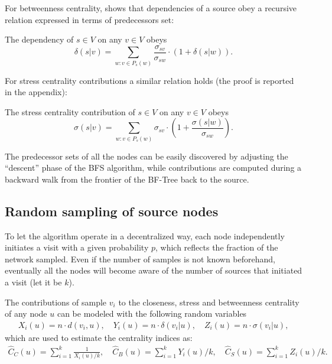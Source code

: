 For betweenness centrality, \cite{brandes2001} shows that dependencies of a source obey a recursive relation expressed in terms of predecessors set:
\begin{theorem}[Brandes, 2001]
The dependency of $s \in V$ on any $v \in V$ obeys
\begin{equation}
\delta(s|v) = \sum_{w : v \in P_s(w)} \frac{\sigma_{sv}}{\sigma_{sw}} \cdot (1 + \delta(s|w)) .
\end{equation}
\end{theorem}
For stress centrality contributions a similar relation holds (the proof is reported in the appendix):
\begin{theorem}
The stress centrality contribution of $s \in V$ on any $v \in V$ obeys
\begin{equation}
\sigma(s|v) = \sum_{w : v \in P_s(w)} \sigma_{sv} \cdot \left( 1 + \frac{\sigma(s|w)}{\sigma_{sw}} \right) .
\end{equation}
\end{theorem}

The predecessor sets of all the nodes can be easily discovered by adjusting the ``descent'' phase of the BFS algorithm, while contributions are computed during a backward walk from the frontier of the BF-Tree back to the source.

\subsection{Random sampling of source nodes}

To let the algorithm operate in a decentralized way, each node independently initiates a visit with a given probability $p$, which reflects the fraction of the network sampled. Even if the number of samples is not known beforehand, eventually all the nodes will become aware of the number of sources that initiated a visit (let it be $k$).

The contributions of sample $v_i$ to the closeness, stress and betweenness centrality of any node $u$ can be modeled with the following random variables
\begin{eqnarray*}
X_i(u) = n \cdot d(v_i,u) , \quad
Y_i(u) = n \cdot \delta(v_i|u) , \quad
Z_i(u) = n \cdot \sigma(v_i|u) ,
\end{eqnarray*}
which are used to estimate the centrality indices as:
\begin{eqnarray*}
\widehat{C}_C(u) = \sum_{i=1}^k \frac{1}{X_i(u)/k} , \quad
\widehat{C}_B(u) = \sum_{i=1}^k Y_i(u)/k , \quad
\widehat{C}_S(u) = \sum_{i=1}^k Z_i(u)/k .
\end{eqnarray*}

